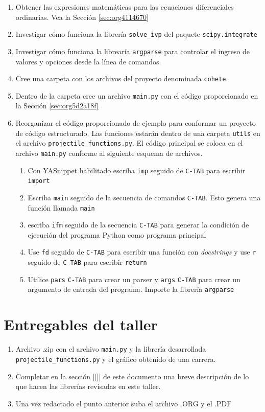 \documentclass{article}
\begin{document}
\begin{enumerate}
\item Obtener las expresiones matemáticas para las ecuaciones
diferenciales ordinarias. Vea la Sección \ref{sec:org4114670}
\item Investigar cómo funciona la librería \texttt{solve\_ivp} del paquete
\texttt{scipy.integrate}
\item Investigar cómo funciona la librearía \texttt{argparse} para controlar el
ingreso de valores y opciones desde la línea de comandos.
\item Cree una carpeta con los archivos del proyecto denominada \texttt{cohete}.
\item Dentro de la carpeta cree un archivo \texttt{main.py} con el código
proporcionado en la Sección \ref{sec:org5d2a18f}
\item Reorganizar el código proporcionado de ejemplo para conformar un
proyecto de código estructurado. Las funciones estarán dentro de
una carpeta \texttt{utils} en el archivo \texttt{projectile\_functions.py}. El
código principal se coloca en el archivo \texttt{main.py} conforme al
siguiente esquema de archivos.
\begin{enumerate}
\item Con YASnippet habilitado escriba \texttt{imp} seguido de \texttt{C-TAB} para
escribir \texttt{import}
\item Escriba \texttt{main} seguido de la secuencia
de comandos \texttt{C-TAB}. Esto genera una función llamada \texttt{main}
\item escriba \texttt{ifm} seguido de la secuencia \texttt{C-TAB} para generar la
condición de ejecución del programa Python como programa
principal
\item Use \texttt{fd} seguido de \texttt{C-TAB} para escribir una función con
\emph{docstrings} y use \texttt{r} seguido de \texttt{C-TAB} para escribir \texttt{return}
\item Utilice \texttt{pars} \texttt{C-TAB} para crear un parser y \texttt{args} \texttt{C-TAB}
para crear un argumento de entrada del programa. Importe la
librería \texttt{argparse}
\end{enumerate}
\end{enumerate}

\section{Entregables del taller}
\label{sec:orgc86f392}
\begin{enumerate}
\item Archivo .zip con el archivo \texttt{main.py} y la librería desarrollada
\texttt{projectile\_functions.py} y el gráfico obtenido de una carrera.
\item Completar en la sección [[]] de este documento una breve
descripción de lo que hacen las librerías revisadas en este taller.
\item Una vez redactado el punto anterior suba el archivo .ORG y el .PDF
\end{enumerate}
\end{document}
